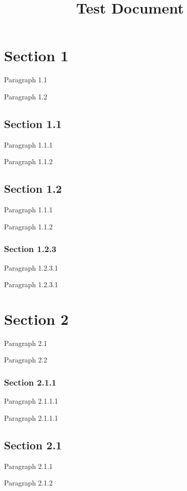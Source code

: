 \documentclass[11pt,a4paper]{article}
\title{Test Document}
\begin{document}
\maketitle

\section{Section 1}

Paragraph 1.1

Paragraph 1.2

\subsection{Section 1.1}

Paragraph 1.1.1

Paragraph 1.1.2

\subsection{Section 1.2}

Paragraph 1.1.1

Paragraph 1.1.2

\subsubsection{Section 1.2.3}

Paragraph 1.2.3.1

Paragraph 1.2.3.1

\section{Section 2}

Paragraph 2.1

Paragraph 2.2

\subsubsection{Section 2.1.1}

Paragraph 2.1.1.1

Paragraph 2.1.1.1

\subsection{Section 2.1}

Paragraph 2.1.1

Paragraph 2.1.2
\end{document}
